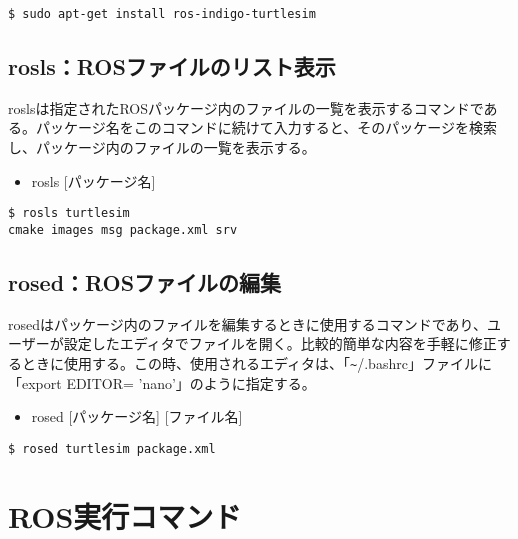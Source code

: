 \begin{lstlisting}[language=ROS]
$ sudo apt-get install ros-indigo-turtlesim
\end{lstlisting}

\subsection{rosls：ROSファイルのリスト表示}

roslsは指定されたROSパッケージ内のファイルの一覧を表示するコマンドである。パッケージ名をこのコマンドに続けて入力すると、そのパッケージを検索し、パッケージ内のファイルの一覧を表示する。\\

\begin{itemize}
\item  rosls [パッケージ名]\\
\end{itemize}

\begin{lstlisting}[language=ROS]
$ rosls turtlesim
cmake images msg package.xml srv
\end{lstlisting}

\subsection{rosed：ROSファイルの編集}

rosedはパッケージ内のファイルを編集するときに使用するコマンドであり、ユーザーが設定したエディタでファイルを開く。比較的簡単な内容を手軽に修正するときに使用する。この時、使用されるエディタは、「\verb|~|/.bashrc」ファイルに「export EDITOR= 'nano'」のように指定する。\\

\begin{itemize}
\item   rosed [パッケージ名] [ファイル名]\\
\end{itemize}

\begin{lstlisting}[language=ROS]
$ rosed turtlesim package.xml
\end{lstlisting}

\section{ROS実行コマンド}

